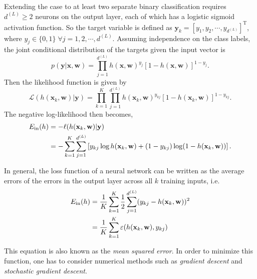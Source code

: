 Extending the case to at least two separate binary classification requires $d^{(L)}\geq 2$ neurons on the output layer, each of which has a logistic sigmoid activation function. So the target variable is defined as $\mathbf{y}_k=[y_1,y_2,\cdots,y_{d^{(L)}}]^{\mathrm{T}}$, where $y_j\in\{0,1\}\;\forall j=1,2,\cdots, d^{(L)}$. Assuming independence on the class labels, the joint conditional distribution of the targets given the input vector is
$$
p(\mathbf{y}|\mathbf{x},\mathbf{w})=\prod_{j=1}^{d^{(L)}}h(\mathbf{x},\mathbf{w})^{y_j}\left[1-h(\mathbf{x},\mathbf{w})\right]^{1-y_j}.
$$
Then the likelihood function is given by
$$
\mathcal{L}(h(\mathbf{x}_k,\mathbf{w})|\mathbf{y})=\prod_{k=1}^{K}\prod_{j=1}^{d^{(L)}}h(\mathbf{x}_{k},\mathbf{w})^{y_{kj}}\left[1-h(\mathbf{x}_{k},\mathbf{w})\right]^{1-y_{kj}}.
$$
The negative log-likelihood then becomes,
\begin{align}
E_{\mathrm{in}}(h)&=-\ell (h(\mathbf{x}_{k},\mathbf{w})|\mathbf{y})\nonumber\\
&=-\sum_{k=1}^{K}\sum_{j=1}^{d^{(L)}}\left[y_{kj}\log h(\mathbf{x}_{k},\mathbf{w})+(1-y_{kj})\log(1-h(\mathbf{x}_{k},\mathbf{w}))\right].\label{eq:mlogitein}
\end{align}

In general, the loss function of a neural network can be written as the average errors of the errors in the output layer across all $k$ training inputs, i.e.
\begin{align}
E_{\mathrm{in}}(h)&=\frac{1}{K}\sum_{k=1}^K\frac{1}{2}\sum_{j=1}^{d^{(L)}}(y_{kj}-h(\mathbf{x}_{k},\mathbf{w}))^2\\
&=\frac{1}{K}\sum_{k=1}^K\varepsilon(h(\mathbf{x}_{k},\mathbf{w}),y_{kj})
\end{align}

This equation is also known as the \textit{mean squared error}. In order to minimize this function, one has to consider numerical methods such as \textit{gradient descent} and \textit{stochastic gradient descent}.
